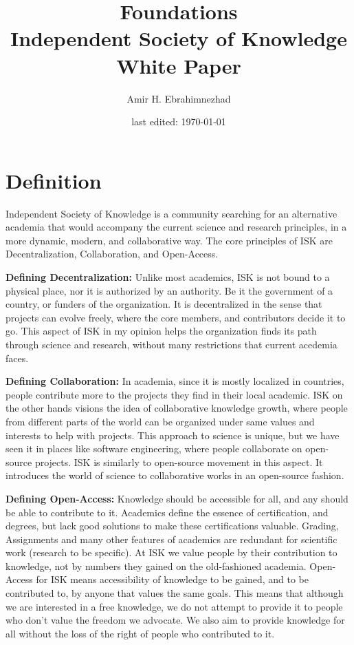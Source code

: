 \documentclass[10pt]{article}
\title{Foundations \\ \large Independent Society of Knowledge White Paper}
\author{Amir H. Ebrahimnezhad}
\date{last edited: \today}
\begin{document}
\maketitle
\section{Definition}\label{sec:definition}
Independent Society of Knowledge is a community searching for an alternative academia that would accompany the current science and research principles, in a more dynamic, modern, and collaborative way.
The core principles of ISK are Decentralization, Collaboration, and Open-Access.

\textbf{Defining Decentralization:} Unlike most academics, ISK is not bound to a physical place, nor it is authorized by an authority.
Be it the government of a country, or funders of the organization.
It is decentralized in the sense that projects can evolve freely, where the core members, and contributors decide it to go.
This aspect of ISK in my opinion helps the organization finds its path through science and research, without many restrictions that current acedemia faces.

\textbf{Defining Collaboration:} In academia, since it is mostly localized in countries, people contribute more to the projects they find in their local academic.
ISK on the other hands visions the idea of collaborative knowledge growth, where people from different parts of the world can be organized under same values and interests to help with projects.
This approach to science is unique, but we have seen it in places like software engineering, where people collaborate on open-source projects.
ISK is similarly to open-source movement in this aspect.
It introduces the world of science to collaborative works in an open-source fashion.

\textbf{Defining Open-Access:} Knowledge should be accessible for all, and any should be able to contribute to it.
Academics define the essence of certification, and degrees, but lack good solutions to make these certifications valuable.
Grading, Assignments and many other features of academics are redundant for scientific work (research to be specific).
At ISK we value people by their contribution to knowledge, not by numbers they gained on the old-fashioned academia.
Open-Access for ISK means accessibility of knowledge to be gained, and to be contributed to, by anyone that values the same goals.
This means that although we are interested in a free knowledge, we do not attempt to provide it to people who don't value the freedom we advocate.
We also aim to provide knowledge for all without the loss of the right of people who contributed to it.
\end{document}
